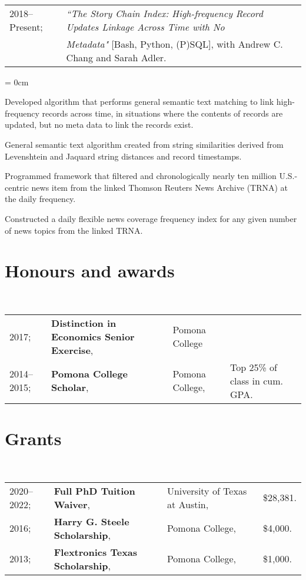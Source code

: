 \documentclass[a4paper, 11pt]{article}
\begin{document}
  ~\begin{tabular}{ll}
    2018--Present; & \textit{``The Story Chain Index: High-frequency Record Updates Linkage Across Time with No}\\
    & \textit{Metadata"} {[Bash, Python, (P)SQL]}, with Andrew C. Chang and Sarah Adler.
  \end{tabular}
  \begin{compactitem}\parskip = 0cm
    \item Developed algorithm that performs general semantic text matching to link high-frequency records across time, in situations where the contents of records are updated, but no meta data to link the records exist.
    \item General semantic text algorithm created from string similarities derived from Levenshtein and Jaquard string distances and record timestamps.
    \item Programmed framework that filtered and chronologically nearly ten million U.S.-centric news item from the linked Thomson Reuters News Archive (TRNA) at the daily frequency.
    \item Constructed a daily flexible news coverage frequency index for any given number of news topics from the linked TRNA.
  \end{compactitem}
      
  \section{Honours and awards}
  ~\begin{tabular}{llll}
    2017; & \textbf{Distinction in Economics Senior Exercise}, & Pomona College\\
    2014--2015; & \textbf{Pomona College Scholar}, & Pomona College, & Top 25\% of class in cum. GPA.\\
  \end{tabular}
      
  \section{Grants}
  ~\begin{tabular}{llll}
    2020--2022; & \textbf{Full PhD Tuition Waiver}, & University of Texas at Austin, & \$28,381. \\
    2016; & \textbf{Harry G. Steele Scholarship}, & Pomona College, & \$4,000.\\
    2013; & \textbf{Flextronics Texas Scholarship}, & Pomona College, & \$1,000.
  \end{tabular}
      
\end{document}
